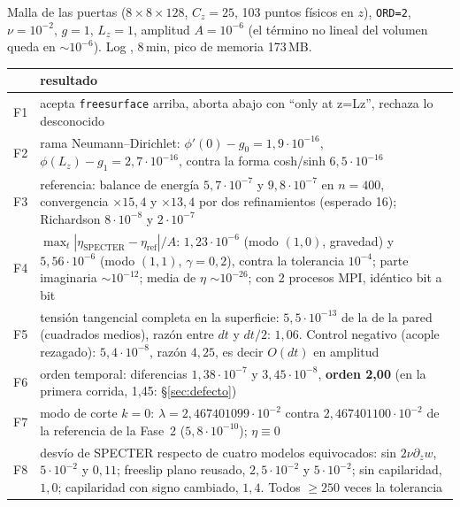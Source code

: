 Malla de las puertas ($8\times8\times128$, $C_z=25$, 103 puntos físicos en $z$),
\texttt{ORD=2}, $\nu=10^{-2}$, $g=1$, $L_z=1$, amplitud $A=10^{-6}$ (el término no lineal
del volumen queda en $\sim10^{-6}$). Log ,
8\,min, pico de memoria 173\,MB.

\begin{center}\small
\begin{tabular}{lp{11.6cm}}
\toprule
& resultado \\ \midrule
F1 & acepta \texttt{freesurface} arriba, aborta abajo con ``only at z=Lz'', rechaza lo desconocido \\
F2 & rama Neumann--Dirichlet: $\phi'(0)-g_0=1{,}9\cdot10^{-16}$, $\phi(L_z)-g_1=2{,}7\cdot10^{-16}$, contra la forma cosh/sinh $6{,}5\cdot10^{-16}$ \\
F3 & referencia: balance de energía $5{,}7\cdot10^{-7}$ y $9{,}8\cdot10^{-7}$ en $n=400$, convergencia $\times15{,}4$ y $\times13{,}4$ por dos refinamientos (esperado 16); Richardson $8\cdot10^{-8}$ y $2\cdot10^{-7}$ \\
F4 & $\max_t|\eta_{\text{SPECTER}}-\eta_{\text{ref}}|/A$: \textbf{$1{,}23\cdot10^{-6}$} (modo $(1,0)$, gravedad) y \textbf{$5{,}56\cdot10^{-6}$} (modo $(1,1)$, $\gamma=0{,}2$), contra la tolerancia $10^{-4}$; parte imaginaria $\sim10^{-12}$; media de $\eta$ $\sim10^{-26}$; con 2 procesos MPI, idéntico bit a bit \\
F5 & tensión tangencial completa en la superficie: \textbf{$5{,}5\cdot10^{-13}$} de la de la pared (cuadrados medios), razón entre $dt$ y $dt/2$: $1{,}06$. Control negativo (acople rezagado): $5{,}4\cdot10^{-8}$, razón $4{,}25$, es decir $O(dt)$ en amplitud \\
F6 & orden temporal: diferencias $1{,}38\cdot10^{-7}$ y $3{,}45\cdot10^{-8}$, \textbf{orden 2{,}00} (en la primera corrida, 1{,}45: §\ref{sec:defecto}) \\
F7 & modo de corte $k=0$: $\lambda=2{,}467401099\cdot10^{-2}$ contra $2{,}467401100\cdot10^{-2}$ de la referencia de la Fase~2 ($5{,}8\cdot10^{-10}$); $\eta\equiv0$ \\
F8 & desvío de SPECTER respecto de cuatro modelos equivocados: sin $2\nu\partial_zw$, $5\cdot10^{-2}$ y $0{,}11$; freeslip plano reusado, $2{,}5\cdot10^{-2}$ y $5\cdot10^{-2}$; sin capilaridad, $1{,}0$; capilaridad con signo cambiado, $1{,}4$. Todos $\ge250$ veces la tolerancia \\
\bottomrule
\end{tabular}
\end{center}

